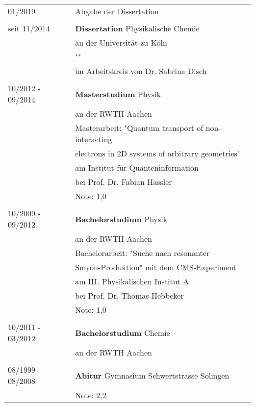 \documentclass[\main/dresen_thesis.tex]{subfiles}
\begin{document}
	\begin{table}[H]
			\begin{tabular}{p{5cm}l}

			01/2019						& Abgabe der Dissertation\\ \\

			seit 11/2014 			& \textbf{Dissertation} Physikalische Chemie\\
												& an der Universität zu Köln \\
												& ""\\ 
												& im Arbeitskreis von Dr. Sabrina Disch \\ \\

			10/2012 - 09/2014 & \textbf{Masterstudium} Physik \\
												& an der RWTH Aachen \\
												& Masterarbeit: "Quantum transport of non-interacting\\
												& electrons in 2D systems of arbitrary geometries" \\
												& am Institut f\"ur Quanteninformation\\
												& bei Prof. Dr. Fabian Hassler\\
												& Note: 1,0\\ \\

			10/2009 - 09/2012 & \textbf{Bachelorstudium} Physik \\
											  & an der RWTH Aachen  \\
												& Bachelorarbeit: "Suche nach resonanter \\
												& Smyon-Produktion" mit dem CMS-Experiment\\
												& am III. Physikalischen Institut A\\
												& bei Prof. Dr. Thomas Hebbeker\\
												& Note: 1,0\\ \\

			10/2011 - 03/2012 & \textbf{Bachelorstudium} Chemie \\
												& an der RWTH Aachen  \\ \\

			08/1999 - 08/2008 & \textbf{Abitur} Gymnasium Schwertstrasse Solingen \\
												& Note: 2,2\\

			\end{tabular}%
	\end{table}%
\end{document}
